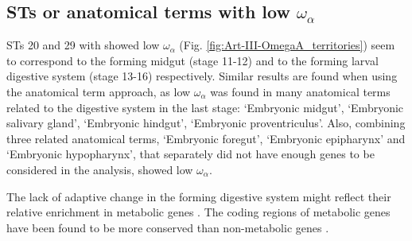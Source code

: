 \subsection{STs or anatomical terms with low {\large$\omega_{\alpha}$}}
STs 20 and 29 with showed low $\omega_{\alpha}$ (Fig. \ref{fig:Art-III-OmegaA_territories}) seem to correspond to the forming midgut (stage 11-12) and to the forming larval digestive system (stage 13-16) respectively.
Similar results are found when using the anatomical term approach, as low $\omega_{\alpha}$ was found in many anatomical terms related to the digestive system in the last stage: `Embryonic midgut', `Embryonic salivary gland', `Embryonic hindgut', `Embryonic proventriculus'. 
Also, combining three related anatomical terms, `Embryonic foregut', `Embryonic epipharynx' and `Embryonic hypopharynx', that separately did not have enough genes to be considered in the analysis, showed low $\omega_{\alpha}$. 

The lack of adaptive change in the forming digestive system might reflect their relative enrichment in metabolic genes \citep{Marianes2013}. The coding regions of metabolic genes have been found to be more conserved than non-metabolic genes \citep{Peregrin-Alvarez2009}.




